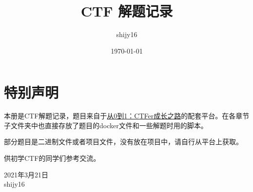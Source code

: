 \documentclass[cn,11pt,chinese]{elegantbook}
\title{CTF 解题记录}
\author{shijy16}
\date{\today}
\begin{document}
\maketitle

\chapter*{特别声明}

本册是CTF解题记录，题目来自于\href{https://book.nu1l.com/}{从0到1：CTFer成长之路}的配套平台。在各章节子文件夹中也直接存放了题目的docker文件和一些解题时用的脚本。

部分题目是二进制文件或者项目文件，没有放在项目中，请自行从平台上获取。

供初学CTF的同学们参考交流。

\vskip 1.5cm

\begin{flushright}
2021年3月21日\\
shijy16
\end{flushright}


\tableofcontents
\setcounter{page}{1}



\end{document}
